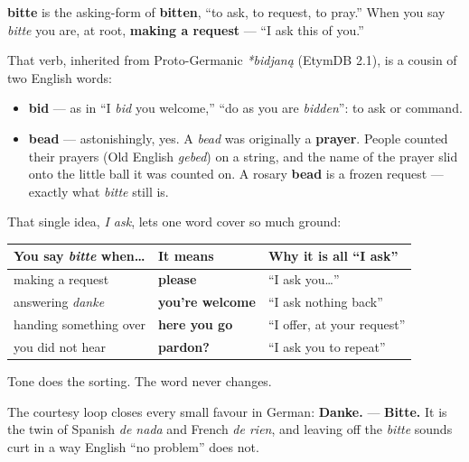 \begin{cousinweb}
\textbf{bitte} is the asking-form of \textbf{bitten}, \textquotedblleft{}to ask, to request, to pray.\textquotedblright{} When you say \emph{bitte} you are, at root, \textbf{making a request} — \textquotedblleft{}I ask this of you.\textquotedblright{}

That verb, inherited from Proto-Germanic \emph{*bidjaną} (EtymDB 2.1), is a cousin of two English words:

\begin{itemize}
\raggedright
  \item \textbf{bid} — as in \textquotedblleft{}I \emph{bid} you welcome,\textquotedblright{} \textquotedblleft{}do as you are \emph{bidden}\textquotedblright{}: to ask or command.
  \item \textbf{bead} — astonishingly, yes. A \emph{bead} was originally a \textbf{prayer}. People counted their prayers (Old English \emph{gebed}) on a string, and the name of the prayer slid onto the little ball it was counted on. A rosary \textbf{bead} is a frozen request — exactly what \emph{bitte} still is.
\end{itemize}

That single idea, \emph{I ask}, lets one word cover so much ground:

\noindent
\begin{tabularx}{\linewidth}{@{}>{\raggedright\arraybackslash}X>{\raggedright\arraybackslash}X>{\raggedright\arraybackslash}X@{}}
\toprule
\textbf{You say \emph{bitte} when…} & \textbf{It means} & \textbf{Why it is all \textquotedblleft{}I ask\textquotedblright{}} \\
\midrule
making a request & \textbf{please} & \textquotedblleft{}I ask you…\textquotedblright{} \\
answering \emph{danke} & \textbf{you're welcome} & \textquotedblleft{}I ask nothing back\textquotedblright{} \\
handing something over & \textbf{here you go} & \textquotedblleft{}I offer, at your request\textquotedblright{} \\
you did not hear & \textbf{pardon?} & \textquotedblleft{}I ask you to repeat\textquotedblright{} \\
\bottomrule
\end{tabularx}

Tone does the sorting. The word never changes.
\end{cousinweb}

\begin{culture}
The courtesy loop closes every small favour in German: \textbf{Danke.} — \textbf{Bitte.} It is the twin of Spanish \emph{de nada} and French \emph{de rien}, and leaving off the \emph{bitte} sounds curt in a way English \textquotedblleft{}no problem\textquotedblright{} does not.
\end{culture}

